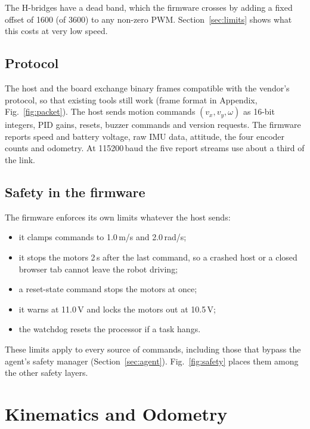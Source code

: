 \documentclass[11pt]{article}
\begin{document}
The H-bridges have a dead band, which the firmware crosses by adding a fixed offset of 1600 (of 3600) to any non-zero PWM. Section~\ref{sec:limits} shows what this costs at very low speed.

\subsection{Protocol}

The host and the board exchange binary frames compatible with the vendor's protocol, so that existing tools still work (frame format in Appendix, Fig.~\ref{fig:packet}). The host sends motion commands $(v_x, v_y, \omega)$ as 16-bit integers, PID gains, resets, buzzer commands and version requests. The firmware reports speed and battery voltage, raw IMU data, attitude, the four encoder counts and odometry. At 115200\,baud the five report streams use about a third of the link.

\subsection{Safety in the firmware}

The firmware enforces its own limits whatever the host sends:

\begin{itemize}
  \item it clamps commands to 1.0\,m/s and 2.0\,rad/s;
  \item it stops the motors 2\,s after the last command, so a crashed host or a closed browser tab cannot leave the robot driving;
  \item a reset-state command stops the motors at once;
  \item it warns at 11.0\,V and locks the motors out at 10.5\,V;
  \item the watchdog resets the processor if a task hangs.
\end{itemize}

These limits apply to every source of commands, including those that bypass the agent's safety manager (Section~\ref{sec:agent}). Fig.~\ref{fig:safety} places them among the other safety layers.

\section{Kinematics and Odometry}
\label{sec:kinematics}
\end{document}
